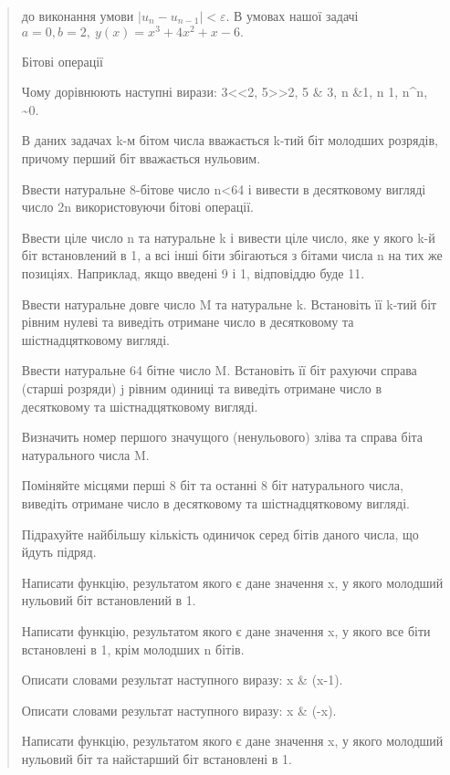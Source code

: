 \documentclass[]{article}
\begin{document}
\begin{quote}
до виконання умови \(\left| u_{n} - u_{n - 1} \right| < \varepsilon\). В
умовах нашої задачі \(a = 0,b = 2,\ y(x) = x^{3} + 4x^{2} + x - 6.\)

\protect\hypertarget{_Hlk63535857}{}{}Бітові операції

Чому дорівнюють наступні вирази: 3\textless{}\textless{}2,
5\textgreater{}\textgreater{}2, 5 \& 3, n \&1, n \textbar{} 1, n\^{}n,
\textasciitilde{}0.

В даних задачах k-м бітом числа вважається k-тий біт молодших розрядів,
причому перший біт вважається нульовим.

Ввести натуральне 8-бітове число n\textless{}64 і вивести в десятковому
вигляді число 2n використовуючи бітові операції.

Ввести ціле число n та натуральне k і вивести ціле число, яке у якого
k-й біт встановлений в 1, а всі інші біти збігаються з бітами числа n на
тих же позиціях. Наприклад, якщо введені 9 і 1, відповіддю буде 11.

Ввести натуральне довге число
\protect\hypertarget{__DdeLink__4_8035966481}{}{}M та натуральне k.
Встановіть її k-тий біт рівним нулеві та виведіть отримане число в
десятковому та шістнадцятковому вигляді.

Ввести натуральне 64 бітне число M. Встановіть її біт рахуючи справа
(старші розряди) j рівним одиниці та виведіть отримане число в
десятковому та шістнадцятковому вигляді.

Визначить номер першого значущого (ненульового) зліва та справа біта
натурального числа M.

Поміняйте місцями перші 8 біт та останні 8 біт натурального числа,
виведіть отримане число в десятковому та шістнадцятковому вигляді.

Підрахуйте найбільшу кількість одиничок серед бітів даного числа, що
йдуть підряд.

Написати функцію, результатом якого є дане значення x, у якого молодший
нульовий біт встановлений в 1.

Написати функцію, результатом якого є дане значення x, у якого все біти
встановлені в 1, крім молодших n бітів.

Описати словами результат наступного виразу: x \& (x-1).

Описати словами результат наступного виразу: x \& (-x).

Написати функцію, результатом якого є дане значення x, у якого молодший
нульовий біт та найстарший біт встановлені в 1.


\end{quote}
\end{document}
